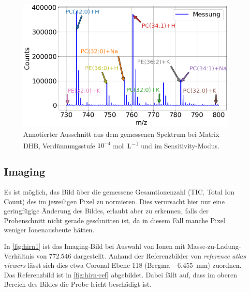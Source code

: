 \begin{figure}[!ht]
    \centering
    \includegraphics[width=1\textwidth]{img/overview_zoom-D02_Oben_S}
    \caption{Annotierter Ausschnitt aus dem gemessenen Spektrum bei Matrix DHB, Verdünnungsstufe $10^{-4}$ \si{\mole \per \liter} und im Sensitivity-Modus.}
    \label{fig:teilspekt}
\end{figure}


\subsection{Imaging}

Es ist möglich, das Bild über die gemessene Gesamtionenzahl (TIC, Total Ion Count) des im jeweiligen Pixel zu normieren. %
Dies verursacht hier nur eine geringfügige Änderung des Bildes, erlaubt aber zu erkennen, falls der Probenschnitt nicht gerade geschnitten ist, da in diesem Fall manche Pixel weniger Ionenausbeute hätten.

In \cref{fig:hirn1} ist das Imaging-Bild bei Auswahl von Ionen mit Masse-zu-Ladung-Verhältnis von \SI{772.546}{} dargestellt.
Anhand der Referenzbilder von \emph{reference atlas viewers} \cite{mouse-brain-map} lässt sich dies etwa Coronal-Ebene 118 (Bregma \SI{-6,455}{mm}) zuordnen.
Das Referenzbild ist in \cref{fig:hirn-ref} abgebildet.
Dabei fällt auf, dass im oberen Bereich des Bildes die Probe leicht beschädigt ist.

